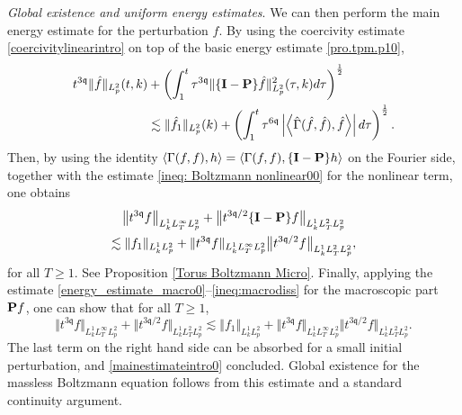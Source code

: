 \documentclass[reqno]{amsart}
\newcommand{\pv}{p}
\def\norm#1{\big\Vert#1\big\Vert}
\newcommand{\irnp}[2]{\left\langle {#1},{#2} \right\rangle}
\newcommand{\qq}{\mathfrak{q}}
\newcommand{\tTq}{t^{3\qq}}
\newcommand{\micro}{{\bf \{I- P\}}}
\theoremstyle{definition}
\numberwithin{equation}{section}
\numberwithin{theorem}{section}
\begin{document}
\textit{Global existence and uniform energy estimates}. We can then perform the main energy estimate for the perturbation \(f\). By using the coercivity estimate \eqref{coercivitylinearintro} on top of the basic energy estimate \eqref{pro.tpm.p10}, 
\begin{align}\notag
  \tTq \Vert \hat{f}\Vert_{L^2_{\pv}}(t,k)
&+
\left(\int^t_1  \tau^{3\qq}\Vert \micro \hat{f} \Vert_{L^2_{\pv}}^2(\tau,k)d\tau \right)^{\frac12}
\\  \notag
&\lesssim  \Vert \hat{f}_1\Vert_{L^2_{\pv}}(k) 
+
\left(\int^t_1 \tau^{6\qq} \left|{\irnp{\hat{\Gamma}(\hat{f},\hat{f})}{\hat{f}}}\right|
d\tau \right)^{\frac12}
.
\end{align}
Then, by using the identity \(\langle  \Gamma(f,f),h\rangle
=
\langle  \Gamma(f,f), \micro h\rangle\) on the Fourier side, together with the estimate \eqref{ineq: Boltzmann nonlinear00} for the nonlinear term, one obtains 
\begin{multline}\notag 
\norm{\tTq f}_{L^1_kL^\infty_TL^2_{\pv}}
+
{\norm{t^{3\qq/2}\micro f}_{L^1_kL^2_TL^2_{\pv}}}
\\
\lesssim 
\Vert {f}_1\Vert_{L^1_kL^2_{\pv}}
+{\Vert{\tTq f}\Vert_{L^1_kL^\infty_TL^2_{\pv}}} {\norm{t^{3\qq/2} f}_{L^1_kL^2_TL^2_{\pv}}},
\end{multline}
for all \(T\geq 1\). See Proposition \ref{Torus Boltzmann Micro}. Finally, applying the estimate \eqref{energy_estimate_macro0}--\eqref{ineq:macrodiss} for the macroscopic part \({\bf P}f\), one can show that for all \(T\geq 1\),
\begin{equation}\label{mainestimateintro}
        {\Vert{\tTq f}\Vert_{L^1_kL^\infty_TL^2_{\pv}}}
+
{\norm{t^{3\qq/2} f}_{L^1_kL^2_TL^2_{\pv}}}
\lesssim 
\norm{ {f}_1}_{L^1_kL^2_{\pv}}
+{\norm{\tTq f}_{L^1_kL^\infty_TL^2_{\pv}}} {\norm{t^{3\qq/2} f}_{L^1_kL^2_TL^2_{\pv}}}.
\end{equation}
The last term on the right hand side can be absorbed for a small initial perturbation, and \eqref{mainestimateintro0} concluded. Global existence for the massless Boltzmann equation follows from this estimate and a standard continuity argument.
\end{document}
